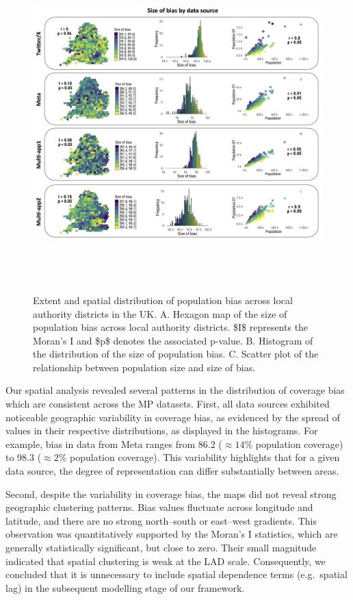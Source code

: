 \documentclass[]{rsos}%
\begin{document}
\begin{figure}
\centering
\includegraphics[width=14cm,height=13cm]{figures/Fig-size-bias.png}
\caption{Extent and spatial distribution of population bias across local
authority districts in the UK. A. Hexagon map of the size of population
bias across local authority districts. \$I\$ represents the Moran's I
and \$p\$ denotes the associated p-value. B. Histogram of the
distribution of the size of population bias. C. Scatter plot of the
relationship between population size and size of
bias.}\label{fig:bias-size}
\end{figure}

Our spatial analysis revealed several patterns in the distribution of
coverage bias which are consistent across the MP
datasets. First, all data sources exhibited noticeable geographic
variability in coverage bias, as evidenced by the spread of values in
their respective distributions, as displayed in the histograms. For
example, bias in data from Meta ranges from 86.2 (\(\approx 14\%\)
population coverage) to 98.3 (\(\approx 2\%\) population coverage). This
variability highlights that for a given data source, the degree of
representation can differ substantially between areas.

Second, despite the variability in coverage bias, the maps did not
reveal strong geographic clustering patterns. Bias values fluctuate
across longitude and latitude, and there are no strong north--south or
east--west gradients. This observation was quantitatively supported by
the Moran's I statistics, which are generally statistically significant,
but close to zero. Their small magnitude indicated that spatial
clustering is weak at the LAD scale. Consequently, we concluded that it
is unnecessary to include spatial dependence terms (e.g.~spatial lag) in
the subsequent modelling stage of our framework.
\end{document}
